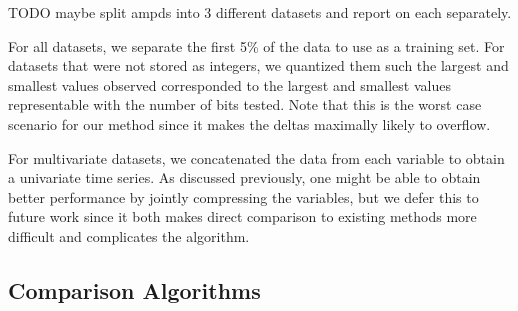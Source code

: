 TODO maybe split ampds into 3 different datasets and report on each separately.

For all datasets, we separate the first 5\% of the data to use as a training set. For datasets that were not stored as integers, we quantized them such the largest and smallest values observed corresponded to the largest and smallest values representable with the number of bits tested. Note that this is the worst case scenario for our method since it makes the deltas maximally likely to overflow.

For multivariate datasets, we concatenated the data from each variable to obtain a univariate time series. As discussed previously, one might be able to obtain better performance by jointly compressing the variables, but we defer this to future work since it both makes direct comparison to existing methods more difficult and complicates the algorithm.


\subsection{Comparison Algorithms}

